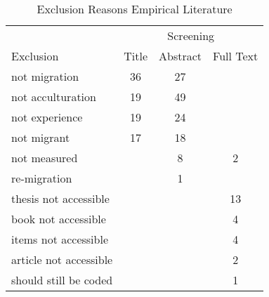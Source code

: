 \begin{table}

\caption{\label{tab:EmpiricalExclusion}Exclusion Reasons Empirical Literature}
\begin{tabular}[t]{lccc}
\toprule
\multicolumn{1}{c}{ } & \multicolumn{3}{c}{Screening} \\
\cmidrule(l{3pt}r{3pt}){2-4}
Exclusion & Title & Abstract & Full Text\\
\midrule
not migration & 36 & 27 & \\
not acculturation & 19 & 49 & \\
not experience & 19 & 24 & \\
not migrant & 17 & 18 & \\
not measured &  & 8 & 2\\
re-migration &  & 1 & \\
thesis not accessible &  &  & 13\\
book not accessible &  &  & 4\\
items not accessible &  &  & 4\\
article not accessible &  &  & 2\\
should still be coded &  &  & 1\\
\bottomrule
\end{tabular}
\end{table}

